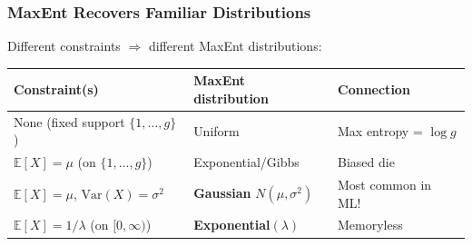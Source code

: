 \documentclass[aspectratio=169]{beamer}
\begin{document}
\begin{frame}
\frametitle{MaxEnt Recovers Familiar Distributions}

\small
Different constraints $\Rightarrow$ different MaxEnt distributions:

\vspace{0.1cm}
\begin{center}
\renewcommand{\arraystretch}{1.4}
\begin{tabular}{lll}
  \textbf{Constraint(s)} & \textbf{MaxEnt distribution} & \textbf{Connection} \\
  \hline
  None (fixed support $\{1,\ldots,g\}$) & Uniform & Max entropy = $\log g$ \\
  $\mathbb{E}[X] = \mu$ (on $\{1,\ldots,g\}$) & Exponential/Gibbs & Biased die \\
  $\mathbb{E}[X] = \mu$, $\text{Var}(X) = \sigma^2$ & \textbf{Gaussian} $N(\mu, \sigma^2)$ & Most common in ML! \\
  $\mathbb{E}[X] = 1/\lambda$ (on $[0, \infty)$) & \textbf{Exponential}$(\lambda)$ & Memoryless \\
  \hline
\end{tabular}
\end{center}

\vspace{0.15cm}
\begin{center}
\end{center}
\end{frame}
\end{document}
